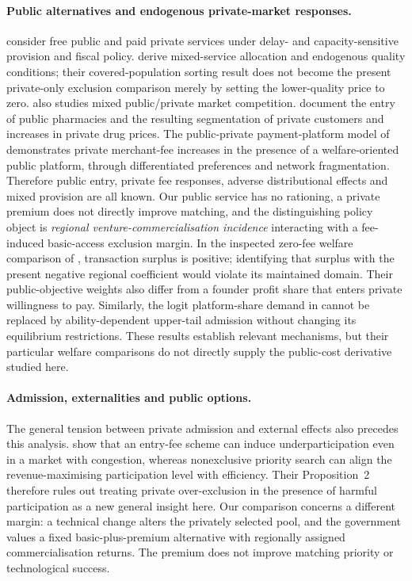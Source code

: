 \paragraph{Public alternatives and endogenous private-market responses.}
\citet{HuaChenZhang2016} consider free public and paid private services under delay- and capacity-sensitive provision and fiscal policy. \citet{LaineMa2017} derive mixed-service allocation and endogenous quality conditions; their covered-population sorting result does not become the present private-only exclusion comparison merely by setting the lower-quality price to zero. \citet{Kim2024} also studies mixed public/private market competition. \citet{AtalCuestaGonzalezOtero2024} document the entry of public pharmacies and the resulting segmentation of private customers and increases in private drug prices. The public-private payment-platform model of \citet{LiuReshidiRivadeneyra2026} demonstrates private merchant-fee increases in the presence of a welfare-oriented public platform, through differentiated preferences and network fragmentation. Therefore public entry, private fee responses, adverse distributional effects and mixed provision are all known. Our public service has no rationing, a private premium does not directly improve matching, and the distinguishing policy object is \emph{regional venture-commercialisation incidence} interacting with a fee-induced basic-access exclusion margin. In the inspected zero-fee welfare comparison of \citet{LiuReshidiRivadeneyra2026}, transaction surplus is positive; identifying that surplus with the present negative regional coefficient would violate its maintained domain. Their public-objective weights also differ from a founder profit share that enters private willingness to pay. Similarly, the logit platform-share demand in \citet{PeitzSato2026} cannot be replaced by ability-dependent upper-tail admission without changing its equilibrium restrictions. These results establish relevant mechanisms, but their particular welfare comparisons do not directly supply the public-cost derivative studied here.

\paragraph{Admission, externalities and public options.}
The general tension between private admission and external effects also precedes this analysis. \citet{KimLiXu2025} show that an entry-fee scheme can induce underparticipation even in a market with congestion, whereas nonexclusive priority search can align the revenue-maximising participation level with efficiency. Their Proposition~2 therefore rules out treating private over-exclusion in the presence of harmful participation as a new general insight here. Our comparison concerns a different margin: a technical change alters the privately selected pool, and the government values a fixed basic-plus-premium alternative with regionally assigned commercialisation returns. The premium does not improve matching priority or technological success.

